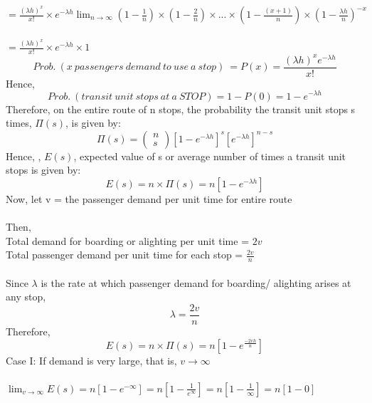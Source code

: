 $  = \frac{(\lambda h)^x}{x!} \times e^{-\lambda h} \lim_{n \to \infty} (1 - \frac{1}{n}) \times (1 - \frac{2}{n}) \times...\times (1 - \frac{(x+1)}{n}) \times (1 - \frac{\lambda h}{n})^{-x} $\\\\
$  = \frac{(\lambda h)^x}{x!} \times e^{-\lambda h} \times 1 $
\begin{equation}
	Prob. \: (x \: passengers \: demand \: to \: use \: a \: stop)\: = P(x) = \frac{(\lambda h)^x e^{- \lambda h}}{x !}
\end{equation}
Hence,
\begin{equation}
	Prob.\: (transit \: unit \: stops \: at \: a \: STOP) = 1 - P(0) = 1 - e^{- \lambda h}
\end{equation}
Therefore, on the entire route of n stops, the probability the transit unit stops s times, $\Pi(s)$, is given by:
\begin{equation}
	\Pi(s) = \begin{pmatrix}
		n\\
		s
	\end{pmatrix} [1 - e^{- \lambda h}]^s [e^{- \lambda h}]^{n - s}
\end{equation}
Hence, , $E(s)$, expected value of s or average number of times a transit unit stops is given by:
\begin{equation}
	E(s) = n\times \Pi(s) = n[1 - e^{- \lambda h}]
\end{equation}
Now, let v = the passenger demand per unit time for entire route\\\\
Then,\\
Total demand for boarding or alighting per unit time = $ 2v $\\
Total passenger demand per unit time for each stop = $ \frac{2v}{n} $\\\\
Since $ \lambda $ is the rate at which passenger demand for boarding/ alighting arises at any stop,\\
$$ \lambda = \frac{2v}{n} $$
Therefore,
\begin{equation}
	E(s) = n\times \Pi(s) = n \left[1 - e^\frac{- 2vh}{n}\right]
\end{equation}
Case I: If demand is very large, that is, $ v \to \infty $\\\\
$ \lim_{v \to \infty} E(s) = n [1 - e^{-\infty}]  = n \left[ 1 - \frac{1}{e^\infty}\right] = n \left[ 1 - \frac{1}{\infty}\right] = n [1 - 0] $\\\\
